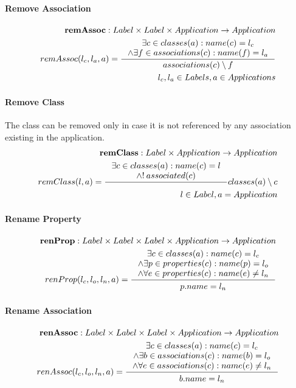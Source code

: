 \documentclass[11pt]{article}
\begin{document}
\paragraph{Remove Association}
\begin{align*}
	\mathbf{remAssoc} : Label \times Label \times Application \rightarrow Application \\
	remAssoc(l_c, l_a, a) = \inference{\exists c \in classes(a) : name(c) = l_c \\ \wedge \exists f \in associations(c) : name(f) = l_a }{associations(c) \setminus f} \\
	l_c, l_a \in Labels, a \in Applications
\end{align*}
\paragraph{Remove Class} The class can be removed only in case it is not referenced by any association existing in the application.
\begin{align*}
	\mathbf{remClass} : Label \times Application \rightarrow Application \\
	remClass(l, a) = \inference{\exists c \in classes(a) : name(c) = l \\ \wedge !\: associated(c)
	} {classes(a) \setminus c }\\
	l \in Label, a = Application
\end{align*}
\paragraph{Rename Property}
\begin{align*}
	\mathbf{renProp} : Label \times Label \times Label \times Application \rightarrow Application \\
	renProp(l_c, l_o, l_n, a) = \inference{\exists c \in classes(a) : name(c) = l_c \\ \wedge \exists p \in properties(c) : name(p) = l_o \\ \wedge \forall e \in properties(c) : name(e) \neq l_n
	}{\begin{gathered}
		p.name = l_n 
	\end{gathered}}
\end{align*}
\paragraph{Rename Association}
\begin{align*}
	\mathbf{renAssoc} : Label \times Label \times Label \times Application \rightarrow Application \\
	renAssoc(l_c, l_o, l_n, a) = \inference{\exists c \in classes(a) : name(c) = l_c \\ \wedge \exists b \in associations(c) : name(b) = l_o \\ \wedge \forall e \in associations(c) : name(e) \neq l_n
	}{\begin{gathered}
		b.name = l_n 
	\end{gathered}}
\end{align*}
\end{document}
